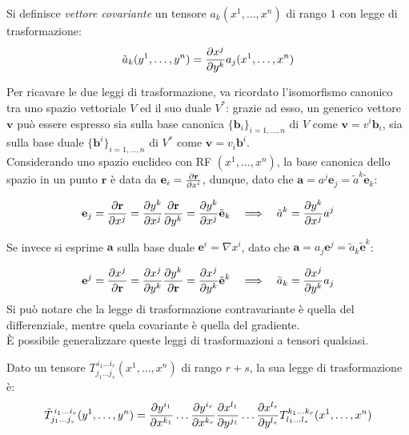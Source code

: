 \begin{definition}
	Si definisce \textit{vettore covariante} un tensore $ a_k (x^1, \dots, x^n) $ di rango $ 1 $ con legge di trasformazione:
	\begin{equation}
		\tilde{a}_k (y^1, \dots, y^n) = \frac{\partial x^j}{\partial y^k} a_j (x^1, \dots, x^n)
		\label{eq:5}
	\end{equation}
\end{definition}

Per ricavare le due leggi di trasformazione, va ricordato l'isomorfismo canonico tra uno spazio vettoriale $ V $ ed il suo duale $ V^* $: grazie ad esso, un generico vettore $ \mathbf{v} $ può essere espresso sia sulla base canonica $ \{\mathbf{b}_i\}_{i=1,\dots,n} $ di $ V $ come $ \mathbf{v} = v^i \mathbf{b}_i $, sia sulla base duale $ \{\mathbf{b}^i\}_{i=1,\dots,n} $ di $ V^* $ come $ \mathbf{v} = v_i \mathbf{b}^i $. \\ 
%
Considerando uno spazio euclideo con RF $ (x^1, \dots, x^n) $, la base canonica dello spazio in un punto $ \mathbf{r} $ è data da $ \mathbf{e}_i = \frac{\partial \mathbf{r}}{\partial x^i} $, dunque, dato che $ \mathbf{a} = a^j \mathbf{e}_j = \tilde{a}^k \tilde{\mathbf{e}}_k $:

\begin{equation}
	\mathbf{e}_j = \frac{\partial \mathbf{r}}{\partial x^j} = \frac{\partial y^k}{\partial x^j} \frac{\partial \mathbf{r}}{\partial y^k} = \frac{\partial y^k}{\partial x^j} \tilde{\mathbf{e}}_k \quad \Longrightarrow \quad \tilde{a}^k = \frac{\partial y^k}{\partial x^j} a^j
	\label{eq:6}
\end{equation}

Se invece si esprime $ \mathbf{a} $ sulla base duale $ \mathbf{e}^i = \nabla x^i $, dato che $ \mathbf{a} = a_j \mathbf{e}^j = \tilde{a}_k \tilde{\mathbf{e}}^k $:

\begin{equation}
	\mathbf{e}^j = \frac{\partial x^j}{\partial \mathbf{r}} = \frac{\partial x^j}{\partial y^k} \frac{\partial y^k} {\partial \mathbf{r}} = \frac{\partial x^j}{\partial y^k} \tilde{\mathbf{e}}^k \quad \Longrightarrow \quad \tilde{a}_k = \frac{\partial x^j}{\partial y^k} a_j
	\label{eq:7}
\end{equation}
Si può notare che la legge di trasformazione contravariante è quella del differenziale, mentre quela covariante è quella del gradiente. \\
%
È possibile generalizzare queste leggi di trasformazioni a tensori qualsiasi.

\begin{definition}
	Dato un tensore $ T^{\,i_1 \dots i_r}_{j_1 \dots j_s} (x^1, \dots, x^n) $ di rango $ r+s $, la sua legge di trasformazione è:
	\begin{equation}
		\tilde{T}^{\,i_1 \dots i_r}_{j_1 \dots j_s} (y^1, \dots, y^n) = \frac{\partial y^{i_1}}{\partial x^{k_1}} \dots \frac{\partial y^{i_r}}{\partial x^{k_r}} \frac{\partial x^{l_1}}{\partial y^{j_1}} \dots \frac{\partial x^{l_s}}{\partial y^{l_s}} T^{k_1 \dots k_r}_{l_1 \dots l_s} (x^1, \dots, x^n)
		\label{eq:8}
	\end{equation}
\end{definition}

